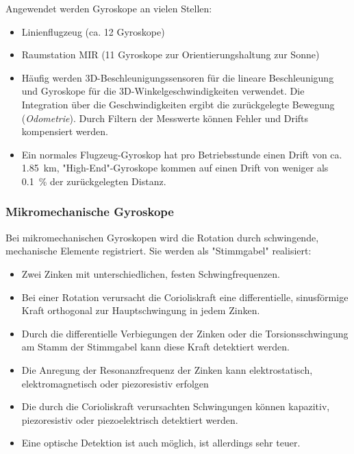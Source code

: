 			Angewendet werden Gyroskope an vielen Stellen:
			\begin{itemize}
				\item Linienflugzeug (ca. \num{12} Gyroskope)
				\item Raumstation MIR (\num{11} Gyroskope zur Orientierungshaltung zur Sonne)
				\item Häufig werden 3D-Beschleunigungssensoren für die lineare Beschleunigung und Gyroskope für die 3D-Winkelgeschwindigkeiten verwendet. Die Integration über die Geschwindigkeiten ergibt die zurückgelegte Bewegung (\emph{Odometrie}). Durch Filtern der Messwerte können Fehler und Drifts kompensiert werden.
				\item Ein normales Flugzeug-Gyroskop hat pro Betriebsstunde einen Drift von ca. \SI{1.85}{\kilo\meter}, "High-End"-Gyroskope kommen auf einen Drift von weniger als \SI{0.1}{\percent} der zurückgelegten Distanz.
			\end{itemize}

		\subsubsection{Mikromechanische Gyroskope}
			Bei mikromechanischen Gyroskopen wird die Rotation durch schwingende, mechanische Elemente registriert. Sie werden \zB als "Stimmgabel" realisiert:
			\begin{itemize}
				\item Zwei Zinken mit unterschiedlichen, festen Schwingfrequenzen.
				\item Bei einer Rotation verursacht die Corioliskraft eine differentielle, sinusförmige Kraft orthogonal zur Hauptschwingung in jedem Zinken.
				\item Durch die differentielle Verbiegungen der Zinken oder die Torsionsschwingung am Stamm der Stimmgabel kann diese Kraft detektiert werden.
				\item Die Anregung der Resonanzfrequenz der Zinken kann elektrostatisch, elektromagnetisch oder piezoresistiv erfolgen
				\item Die durch die Corioliskraft verursachten Schwingungen können kapazitiv, piezoresistiv oder piezoelektrisch detektiert werden.
				\item Eine optische Detektion ist auch möglich, ist \iA allerdings sehr teuer.
			\end{itemize}


